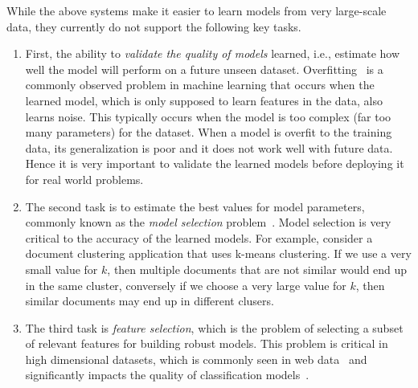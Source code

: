 \documentclass{vldb}
\newcommand{\eat}[1]{} %
\begin{document}
While the above systems make it easier to learn models from very large-scale
data, they currently do not support the following key tasks.

\begin{enumerate}
\item
First, the ability to {\em validate the quality of models} learned, i.e.,
estimate how well the model will perform on a future unseen dataset.
Overfitting~\cite{Kohavi95featuresubset} is a commonly observed
problem in machine learning that occurs when the learned model, which is only
supposed to learn features in the data, also learns noise. This typically occurs
when the model is too complex (far too many parameters) for the dataset. When a
model is overfit to the training data, its generalization is poor and it does
not work well with future data. Hence it is very important to validate the learned
models before deploying it for real world problems.

\item 
The second task is to estimate the best values for model parameters, commonly
known as the {\em model selection}
problem~\cite{Scheffer/Joachims/99a,DBLP:journals/bioinformatics/TroyanskayaCSBHTBA01}. 
\eat{Model selection is the
problem of selecting the right model and picking the right parameters for the
model.} Model selection is very critical to the accuracy of the learned models.
For example, consider a document clustering application that uses k-means
clustering. If we use a very small value for $k$, then multiple documents that
are not similar would end up in the same cluster, conversely if we choose a very
large value for $k$, then similar documents may end up in different clusers. 

\item
The
third task is {\em feature selection}, which is the problem of selecting
a subset of relevant features for building robust models. This problem is
critical in high dimensional datasets, which is commonly seen in web
data~\cite{DBLP:conf/icdm/MalikK08,Kriegel:2009:CHD:1497577.1497578} and significantly impacts the quality of classification
models~\cite{DBLP:journals/jmlr/GuyonE03}.
\end{enumerate}

\eat{\item {\em Learning complex models:} This is a class of classification algorithms
that build a set (or an ensemble) of classifiers that are usually more accurate
than any single classifier. Ensemble learning algorithms have been used recently
in the Netflix prize, almost every entry in the top-10 used some kind of
ensemble.}
\end{document}
